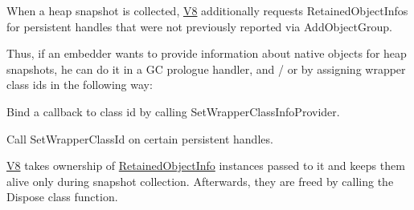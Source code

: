 \begin{DoxyEnumerate}
\item When a heap snapshot is collected, \hyperlink{classv8_1_1V8}{V8} additionally requests Retained\-Object\-Infos for persistent handles that were not previously reported via Add\-Object\-Group.
\end{DoxyEnumerate}

Thus, if an embedder wants to provide information about native objects for heap snapshots, he can do it in a G\-C prologue handler, and / or by assigning wrapper class ids in the following way\-:


\begin{DoxyEnumerate}
\item Bind a callback to class id by calling Set\-Wrapper\-Class\-Info\-Provider.
\item Call Set\-Wrapper\-Class\-Id on certain persistent handles.
\end{DoxyEnumerate}

\hyperlink{classv8_1_1V8}{V8} takes ownership of \hyperlink{classv8_1_1RetainedObjectInfo}{Retained\-Object\-Info} instances passed to it and keeps them alive only during snapshot collection. Afterwards, they are freed by calling the Dispose class function. 

